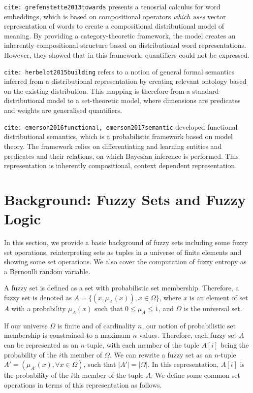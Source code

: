 \documentclass[11pt]{book}
\newcommand{\card}[1]{\left| #1 \right|}
\newcommand{\citet}[1]{\texttt{cite: #1}}
\begin{document}
\citet{grefenstette2013towards} presents a tenosrial calculus for word
embeddings, which is based on compositional operators \emph{which uses} vector
representation of words to create a compositional distributional model of
meaning. By providing a category-theoretic framework, the model creates an
inherently compositional structure based on distributional word
representations. However, they showed that in this framework, quantifiers could
not be expressed.

\citet{herbelot2015building} refers to a notion of general formal semantics
inferred from a distributional representation by creating relevant ontology
based on the existing distribution. This mapping is therefore from a standard
distributional model to a set-theoretic model, where dimensions are predicates
and weights are generalised quantifiers. 

\citet{emerson2016functional, emerson2017semantic} developed functional
distributional semantics, which is a probabilistic framework based on model
theory. The framework relies on differentiating and learning entities and
predicates and their relations, on which Bayesian inference is performed. This
representation is inherently compositional, context dependent representation. 

\section{Background: Fuzzy Sets and Fuzzy Logic} \label{sec: math}

In this section, we provide a basic background of fuzzy sets including some
fuzzy set operations, reinterpreting sets as tuples in a universe of finite
elements and showing some set operations. We also cover the computation of
fuzzy entropy as a Bernoulli random variable. 

A fuzzy set is defined as a set with probabilistic set membership. Therefore, a
fuzzy set is denoted as $A = \{ (x, \mu_A(x)), x \in \Omega\}$,  where $x$ is
an element of set $A$ with a probability $\mu_A(x)$ such that $0 \leq \mu_A
\leq 1$, and $\Omega$ is the universal set. 

If our universe $\Omega$ is finite and of cardinality $n$, our notion of
probabilistic set membership is constrained to a maximum $n$ values. Therefore,
each fuzzy set $A$ can be represented as an $n$-tuple, with each member of the
tuple $A[i]$ being the probability of the $i$th member of $\Omega$. We can
rewrite a fuzzy set as an $n$-tuple $A' = ( \mu_{A'}(x), \forall x \in \Omega
)$, such that $\card{A'} = \card \Omega$. In this representation, $A[i]$ is the
probability of the $i$th member of the tuple $A$. We define some common set
operations in terms of this representation as follows.
\end{document}
